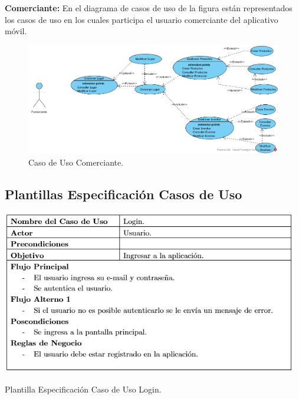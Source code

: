 \documentclass[12pt,letterpaper,openany]{book}
\begin{document}
\textbf{Comerciante:} En el diagrama de casos de uso de la figura están representados los casos de uso en los cuales participa el usuario comerciante del aplicativo móvil.
\begin{figure}[H]
\begin{center}
\includegraphics[width=13cm]{./imagenes/CU/cu_comerciante}
\caption{Caso de Uso Comerciante.}
\end{center}
\end{figure}

\subsection{Plantillas Especificación Casos de Uso}
\begin{table}[H]
\centering
\includegraphics[width=13cm]{./imagenes/PCU/login}
\caption{Plantilla Especificación Caso de Uso Login.}
\end{table}
\end{document}
